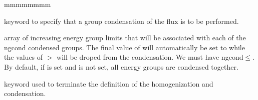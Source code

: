 \begin{ListeDeDescription}{mmmmmmmm}
\item[\moc{COND}] keyword to specify that a group condensation of the flux is
to be performed.

\item[\dusa{icond}] array of increasing energy group limits that will be associated with
each of the ngcond condensed groups. The final value of
 will automatically be set to  while the values of 
$>$ will be droped from the condensation. 
We must have ngcond$\le$. By default, if  is set and 
is not set, all energy groups are condensed together.

\item[\moc{ENDR}] keyword used to terminate the definition of the homogenization and condensation.

\end{ListeDeDescription}

\eject

